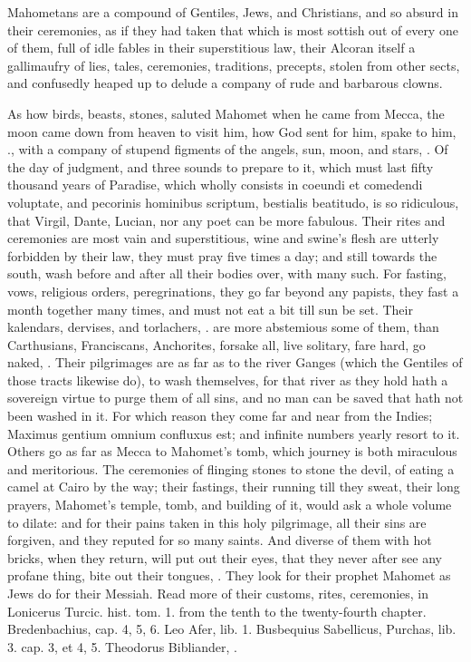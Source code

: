 {Mahometans are a compound of Gentiles, Jews, and Christians, and so
absurd in their ceremonies, as if they had taken that which is most
sottish out of every one of them, full of idle fables in their
superstitious law, their Alcoran itself a gallimaufry of lies, tales,
ceremonies, traditions, precepts, stolen from other sects, and
confusedly heaped up to delude a company of rude and barbarous clowns.

As how birds, beasts, stones, saluted Mahomet when he came from Mecca,
the moon came down from heaven to visit him, how God sent for
him, spake to him, \etc{}., with a company of stupend figments of the
angels, sun, moon, and stars, \etc{}. Of the day of judgment, and three
sounds to prepare to it, which must last fifty thousand years of
Paradise, which wholly consists in coeundi et comedendi voluptate, and
pecorinis hominibus scriptum, bestialis beatitudo, is so ridiculous,
that Virgil, Dante, Lucian, nor any poet can be more fabulous. Their
rites and ceremonies are most vain and superstitious, wine and swine's
flesh are utterly forbidden by their law, they must pray five
times a day; and still towards the south, wash before and after all
their bodies over, with many such. For fasting, vows, religious orders,
peregrinations, they go far beyond any papists, they fast a month
together many times, and must not eat a bit till sun be set. Their
kalendars, dervises, and torlachers, \etc{}. are more abstemious some
of them, than Carthusians, Franciscans, Anchorites, forsake all, live
solitary, fare hard, go naked, \etc{}. Their pilgrimages are as far
as to the river Ganges (which the Gentiles of those tracts
likewise do), to wash themselves, for that river as they hold hath a
sovereign virtue to purge them of all sins, and no man can be saved
that hath not been washed in it. For which reason they come far and
near from the Indies; Maximus gentium omnium confluxus est; and
infinite numbers yearly resort to it. Others go as far as Mecca to
Mahomet's tomb, which journey is both miraculous and meritorious. The
ceremonies of flinging stones to stone the devil, of eating a camel at
Cairo by the way; their fastings, their running till they sweat, their
long prayers, Mahomet's temple, tomb, and building of it, would ask a
whole volume to dilate: and for their pains taken in this holy
pilgrimage, all their sins are forgiven, and they reputed for so many
saints. And diverse of them with hot bricks, when they return, will put
out their eyes, that they never after see any profane thing, bite
out their tongues, \etc{}. They look for their prophet Mahomet as Jews do
for their Messiah. Read more of their customs, rites, ceremonies, in
Lonicerus Turcic. hist. tom. 1. from the tenth to the twenty-fourth
chapter. Bredenbachius, cap. 4, 5, 6. Leo Afer, lib. 1. Busbequius
Sabellicus, Purchas, lib. 3. cap. 3, et 4, 5. Theodorus Bibliander, \etc{}.

}
